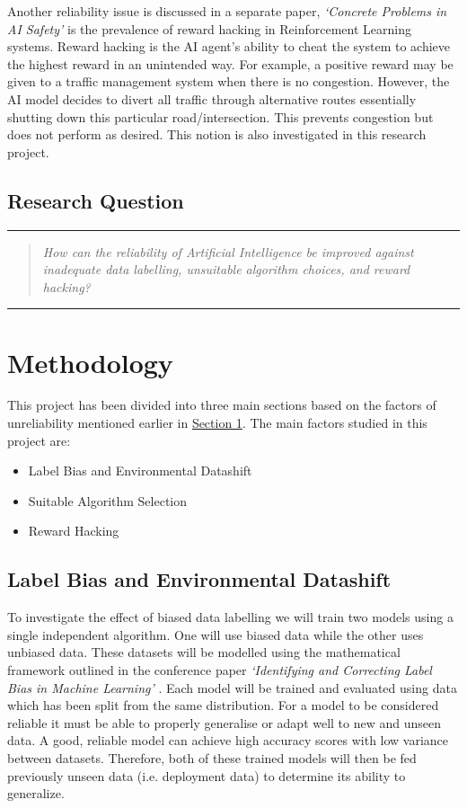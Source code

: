 \documentclass[a4paper,12pt]{report}
\begin{document}
\enlargethispage{-\baselineskip}
Another reliability issue is discussed in a separate paper, \textit{‘Concrete Problems in AI Safety’} \cite{Amodei} is the prevalence of reward hacking in Reinforcement Learning systems. 
Reward hacking is the AI agent’s ability to cheat the system to achieve the highest reward in an unintended way. 
For example, a positive reward may be given to a traffic management system when there is no congestion. However, the AI model decides to divert all traffic through alternative routes essentially shutting down this particular road/intersection. 
This prevents congestion but does not perform as desired. This notion is also investigated in this research project.

\section{Research Question}
\noindent\rule{\linewidth}{0.4pt}
\begin{quotation}
\textit{How can the reliability of Artificial Intelligence be improved against 
inadequate data labelling, unsuitable algorithm choices, and reward 
hacking?}
\end{quotation}
\noindent\rule{\linewidth}{0.4pt}

\chapter{Methodology}
This project has been divided into three main sections based on the factors of unreliability mentioned earlier in \hyperref[chap:chap1]{Section 1}. 
The main factors studied in this project are:
\begin{itemize}
    \item Label Bias and Environmental Datashift
    \item Suitable Algorithm Selection
    \item Reward Hacking
\end{itemize}

\section{Label Bias and Environmental Datashift}
To investigate the effect of biased data labelling we will train two models using a single independent algorithm. 
One will use biased data while the other uses unbiased data. 
These datasets will be modelled using the mathematical framework outlined in the conference paper \textit{‘Identifying and Correcting Label Bias in Machine Learning’} \cite{Jiang}. 
Each model will be trained and evaluated using data which has been split from the same distribution. 
For a model to be considered reliable it must be able to properly generalise or adapt well to new and unseen data. 
A good, reliable model can achieve high accuracy scores with low variance between datasets. 
Therefore, both of these trained models will then be fed previously unseen data (i.e. deployment data) to determine its ability to generalize.
\end{document}
